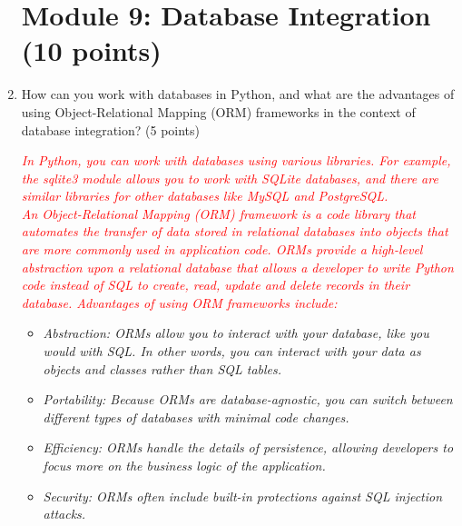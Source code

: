 \documentclass{article}
\begin{document}
\begin{enumerate}
         \section{Module 9: Database Integration (10 points)} \par
         \item How can you work with databases in Python, and what are the advantages
         of using Object-Relational Mapping (ORM) frameworks in the context of
         database integration? (5 points)\par
         \textcolor{red}{\textit{In Python, you can work with databases using various libraries. For example, 
         the sqlite3 module allows you to work with SQLite databases, and there are similar libraries for other databases
          like MySQL and PostgreSQL.  \\
          An Object-Relational Mapping (ORM) framework is a code library that automates the transfer of 
          data stored in relational databases into objects that are more commonly used in application code. 
          ORMs provide a high-level abstraction upon a relational database that allows a developer to write Python code 
          instead of SQL to create, read, update and delete records in their database.
          Advantages of using ORM frameworks include:}}
          \begin{itemize}
            \color{red}
            \item \textit{Abstraction: ORMs allow you to interact with your database, like you would with SQL. 
            In other words, you can interact with your data as objects and classes rather than SQL tables.}
            \item \textit{Portability: Because ORMs are database-agnostic, you can switch between different types of databases with minimal code changes.}
            \item \textit{Efficiency: ORMs handle the details of persistence, allowing developers to focus more on the business logic of the application.}
            \item \textit{Security: ORMs often include built-in protections against SQL injection attacks.}
          \end{itemize}


\end{enumerate}
\end{document}
